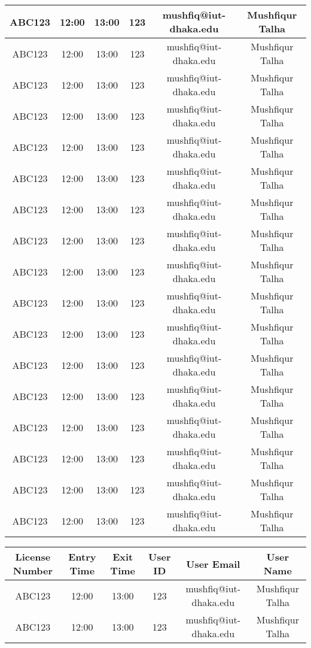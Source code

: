 \documentclass[12pt,notitle]{article}
\begin{document}
\begin{center}
\begin{tabular}{|c|c|c|c|c|c|}
\hline
ABC123 & 12:00 & 13:00 & 123 & mushfiq@iut-dhaka.edu & Mushfiqur Talha \\
\hline
ABC123 & 12:00 & 13:00 & 123 & mushfiq@iut-dhaka.edu & Mushfiqur Talha \\
\hline
ABC123 & 12:00 & 13:00 & 123 & mushfiq@iut-dhaka.edu & Mushfiqur Talha \\
\hline
ABC123 & 12:00 & 13:00 & 123 & mushfiq@iut-dhaka.edu & Mushfiqur Talha \\
\hline
ABC123 & 12:00 & 13:00 & 123 & mushfiq@iut-dhaka.edu & Mushfiqur Talha \\
\hline
ABC123 & 12:00 & 13:00 & 123 & mushfiq@iut-dhaka.edu & Mushfiqur Talha \\
\hline
ABC123 & 12:00 & 13:00 & 123 & mushfiq@iut-dhaka.edu & Mushfiqur Talha \\
\hline
ABC123 & 12:00 & 13:00 & 123 & mushfiq@iut-dhaka.edu & Mushfiqur Talha \\
\hline
ABC123 & 12:00 & 13:00 & 123 & mushfiq@iut-dhaka.edu & Mushfiqur Talha \\
\hline
ABC123 & 12:00 & 13:00 & 123 & mushfiq@iut-dhaka.edu & Mushfiqur Talha \\
\hline
ABC123 & 12:00 & 13:00 & 123 & mushfiq@iut-dhaka.edu & Mushfiqur Talha \\
\hline
ABC123 & 12:00 & 13:00 & 123 & mushfiq@iut-dhaka.edu & Mushfiqur Talha \\
\hline
ABC123 & 12:00 & 13:00 & 123 & mushfiq@iut-dhaka.edu & Mushfiqur Talha \\
\hline
ABC123 & 12:00 & 13:00 & 123 & mushfiq@iut-dhaka.edu & Mushfiqur Talha \\
\hline
ABC123 & 12:00 & 13:00 & 123 & mushfiq@iut-dhaka.edu & Mushfiqur Talha \\
\hline
ABC123 & 12:00 & 13:00 & 123 & mushfiq@iut-dhaka.edu & Mushfiqur Talha \\
\hline
ABC123 & 12:00 & 13:00 & 123 & mushfiq@iut-dhaka.edu & Mushfiqur Talha \\
\hline
\end{tabular}
\begin{tabular}{|c|c|c|c|c|c|}
\hline
\textbf{License Number} & \textbf{Entry Time} & \textbf{Exit Time} & \textbf{User ID} & \textbf{User Email} & \textbf{User Name} \\
\hline\hline
ABC123 & 12:00 & 13:00 & 123 & mushfiq@iut-dhaka.edu & Mushfiqur Talha \\
\hline
ABC123 & 12:00 & 13:00 & 123 & mushfiq@iut-dhaka.edu & Mushfiqur Talha \\

\end{tabular}
\end{center}
\end{document}
